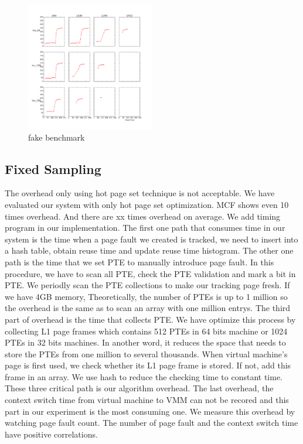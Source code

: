 \documentclass[10pt,twocolumn]{article}
\begin{document}
\begin{figure}[!htp]
	\caption{fake benchmark}
	\label{fig7}
	\includegraphics[width=0.5\textwidth]{img/sampling_exp/sampling_exp_milc.png}
\end{figure} 

\subsection{Fixed Sampling}
The overhead only using hot page set technique is not acceptable. We have evaluated our system with only hot page set optimization. MCF shows even 10 times overhead. And there are xx times overhead on average. We add timing program in our implementation. The first one path that consumes time in our system is the time when a page fault we created is tracked, we need to insert into a hash table, obtain reuse time and update reuse time histogram. The other one path is the time that we set PTE to manually introduce page fault. In this procedure, we have to scan all PTE, check the PTE validation and mark a bit in PTE. We periodly scan the PTE collections to make our tracking page fresh. If we have 4GB memory, Theoretically, the number of PTEs is up to 1 million so the overhead is the same as to scan an array with one million entrys. The third part of overhead is the time that collects PTE. We have optimize this process by collecting L1 page frames which contains 512 PTEs in 64 bits machine or 1024 PTEs in 32 bits machines. In another word, it reduces the space that needs to store the PTEs from one million to several thousands. When virtual machine's page is first used, we check whether its L1 page frame is stored. If not, add this frame in an array. We use hash to reduce the checking time to constant time. These three critical path is our algorithm overhead. The last overhead, the context switch time from virtual machine to VMM can not be recored and this part in our experiment is the most consuming one. We measure this overhead by watching page fault count. The number of page fault and the context switch time have positive correlations.
\end{document}
